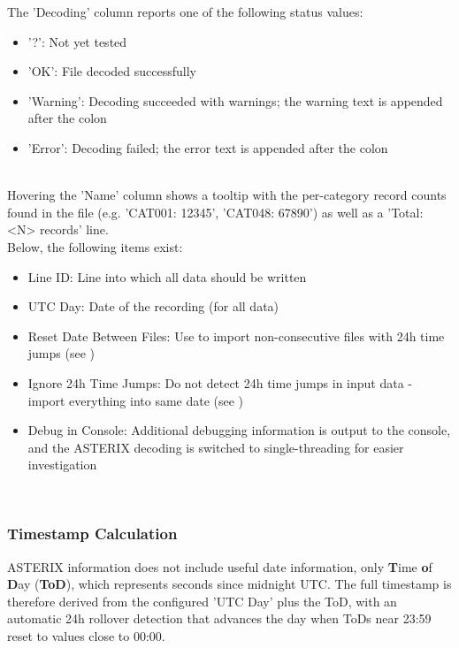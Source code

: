 The 'Decoding' column reports one of the following status values:

\begin{itemize}
\item '?': Not yet tested
\item 'OK': File decoded successfully
\item 'Warning': Decoding succeeded with warnings; the warning text is appended after the colon
\item 'Error': Decoding failed; the error text is appended after the colon
\end{itemize}
\ \\

Hovering the 'Name' column shows a tooltip with the per-category record counts found in the file (e.g. 'CAT001: 12345', 'CAT048: 67890') as well as a 'Total: <N> records' line. \\

Below, the following items exist:
\begin{itemize}
\item Line ID: Line into which all data should be written
\item UTC Day: Date of the recording (for all data)
\item Reset Date Between Files: Use to import non-consecutive files with 24h time jumps (see )
\item Ignore 24h Time Jumps: Do not detect 24h time jumps in input data - import everything into same date (see )
\item Debug in Console: Additional debugging information is output to the console, and the ASTERIX decoding is switched to single-threading for easier investigation
\end{itemize}
\ \\

\subsubsection{Timestamp Calculation}
\label{sec:ui_import_asterix_timestamps}

ASTERIX information does not include useful date information, only \textbf{T}ime \textbf{o}f \textbf{D}ay (\textbf{ToD}), which represents seconds since midnight UTC. The full timestamp is therefore derived from the configured 'UTC Day' plus the ToD, with an automatic 24h rollover detection that advances the day when ToDs near 23:59 reset to values close to 00:00. \\


